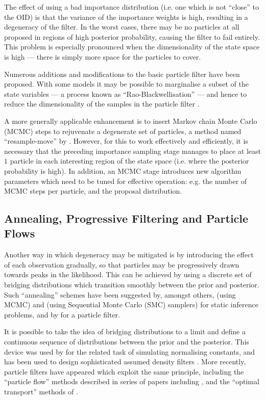 \documentclass{statsoc}
\begin{document}
The effect of using a bad importance distribution (i.e. one which is not ``close'' to the OID) is that the variance of the importance weights is high, resulting in a degeneracy of the filter. In the worst cases, there may be no particles at all proposed in regions of high posterior probability, causing the filter to fail entirely. This problem is especially pronounced when the dimensionality of the state space is high --- there is simply more space for the particles to cover.

Numerous additions and modifications to the basic particle filter have been proposed. With some models it may be possible to marginalise a subset of the state variables --- a process known as ``Rao-Blackwellisation'' --- and hence to reduce the dimensionality of the samples in the particle filter \citep{Casella1996,Doucet2000}.

A more generally applicable enhancement is to insert Markov chain Monte Carlo (MCMC) steps to rejuvenate a degenerate set of particles, a method named ``resample-move'' by \citet{Gilks2001}. However, for this to work effectively and efficiently, it is necessary that the preceding importance sampling stage manages to place at least $1$ particle in each interesting region of the state space (i.e. where the posterior probability is high). In addition, an MCMC stage introduces new algorithm parameters which need to be tuned for effective operation: e.g. the number of MCMC steps per particle, and the proposal distribution.

\subsection{Annealing, Progressive Filtering and Particle Flows}

Another way in which degeneracy may be mitigated is by introducing the effect of each observation gradually, so that particles may be progressively drawn towards peaks in the likelihood. This can be achieved by using a discrete set of bridging distributions which transition smoothly between the prior and posterior. Such ``annealing'' schemes have been suggested by, amongst others, \citet{Neal2001} (using MCMC) and \citet{DelMoral2006} (using Sequential Monte Carlo (SMC) samplers) for static inference problems, and by \citet{Godsill2001b} for a particle filter.

It is possible to take the idea of bridging distributions to a limit and define a continuous sequence of distributions between the prior and the posterior. This device was used by \citet{Gelman1998} for the related task of simulating normalising constants, and has been used to design sophisticated assumed density filters \citep{Hanebeck2003a,Hanebeck2012,Hagmar2011}. More recently, particle filters have appeared which exploit the same principle, including the ``particle flow'' methods described in series of papers including \citep{Daum2008,Daum2011d}, and the ``optimal transport'' methods of \cite{Reich2011,Reich2012a}.
\end{document}

